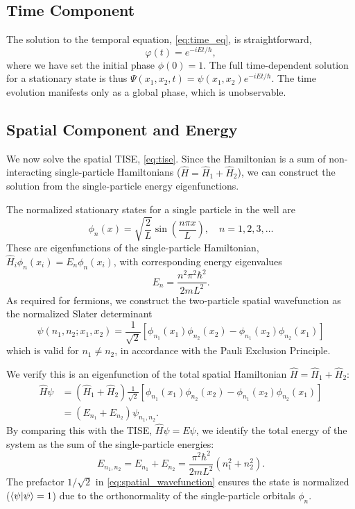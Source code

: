 \subsection{Time Component}
The solution to the temporal equation, \cref{eq:time_eq}, is
straightforward,
\begin{equation}
	\varphi(t) = e^{-iEt/\hbar},
\end{equation}
where we have set the initial phase $\phi(0) = 1$.
The full time-dependent solution for a stationary state is thus
$\Psi(x_1, x_2, t) = \psi(x_1, x_2) e^{-iEt/\hbar}$. The time evolution
manifests only as a global phase, which is unobservable.

\subsection{Spatial Component and Energy}
We now solve the spatial TISE, \cref{eq:tise}. Since the Hamiltonian
is a sum of non-interacting single-particle Hamiltonians
($\hat{H} = \hat{H}_1 + \hat{H}_2$), we can construct the solution
from the single-particle energy eigenfunctions.

The normalized stationary states for a single particle in the well are
\begin{equation}
	\phi_n(x) = \sqrt{\frac{2}{L}} \sin\left(\frac{n\pi x}{L}\right),
	\quad n = 1, 2, 3, \dots
\end{equation}
These are eigenfunctions of the single-particle Hamiltonian,
$\hat{H}_i {\phi}_n(x_i) = E_n {\phi}_n(x_i)$,
with corresponding energy eigenvalues
\begin{equation}
	E_n = \frac{n^2 \pi^2 \hbar^2}{2mL^2}.
\end{equation}
As required for fermions, we construct the two-particle spatial
wavefunction as the normalized Slater determinant
\begin{equation} \label{eq:spatial_wavefunction}
	\psi{(n_1, n_2 ; x_1, x_2)} = \frac{1}{\sqrt{2}} \left[
		{\phi}_{n_1}(x_1){\phi}_{n_2}(x_2) -
		{\phi}_{n_1}(x_2){\phi}_{n_2}(x_1)
	\right]
\end{equation}
which is valid for $n_1 \neq n_2$, in accordance with the
Pauli Exclusion Principle.

We verify this is an eigenfunction of the total spatial Hamiltonian
$\hat{H} = \hat{H}_1 + \hat{H}_2$:
\begin{align}
	\hat{H} \psi
		&= (\hat{H}_1 + \hat{H}_2) \frac{1}{\sqrt{2}} \left[
			{\phi}_{n_1}(x_1){\phi}_{n_2}(x_2) -
		{\phi}_{n_1}(x_2){\phi}_{n_2}(x_1) \right] \nonumber \\
		&= (E_{n_1} + E_{n_2}) \psi_{n_1, n_2}.
\end{align}
By comparing this with the TISE, $\hat{H}\psi = E\psi$, we identify the
total energy of the system as the sum of the single-particle energies:
\begin{equation}
	E_{n_1, n_2} = E_{n_1} + E_{n_2} =
	\frac{\pi^2 \hbar^2}{2mL^2} (n_1^2 + n_2^2).
\end{equation}
The prefactor $1/\sqrt{2}$ in \cref{eq:spatial_wavefunction} ensures
the state is normalized ($\braket{\psi | \psi} = 1$) due to the
orthonormality of the single-particle orbitals ${\phi}_n$.
